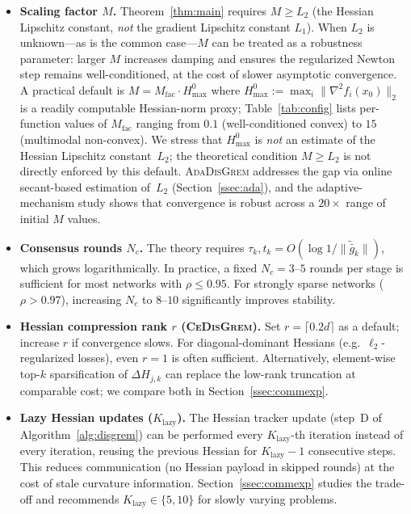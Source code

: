 \documentclass[11pt,a4paper]{article}
\def\cO{O}%
\newcommand{\cO}{\mathcal{O}}
\begin{document}
	\begin{itemize}[leftmargin=1.2em,itemsep=2pt]
		\item \textbf{Scaling factor $M$.}
		Theorem~\ref{thm:main} requires $M\ge L_2$
		(the Hessian Lipschitz constant, \emph{not} the gradient Lipschitz
		constant $L_1$).
		When $L_2$ is unknown---as is the common case---$M$ can be treated
		as a robustness parameter: larger $M$ increases damping and ensures the
		regularized Newton step remains well-conditioned, at the cost of
		slower asymptotic convergence.
		A practical default is $M = M_{\mathrm{fac}} \cdot H_{\max}^{0}$ where
		$H_{\max}^{0} := \max_i\|\nabla^2 f_i(x_0)\|_2$ is a readily
		computable Hessian-norm proxy;
		Table~\ref{tab:config} lists per-function values of $M_{\mathrm{fac}}$
		ranging from $0.1$ (well-conditioned convex) to $15$ (multimodal non-convex).
		We stress that $H_{\max}^{0}$ is \emph{not} an estimate of the Hessian
		Lipschitz constant~$L_2$; the theoretical condition $M\ge L_2$
		is not directly enforced by this default.
		\textsc{AdaDisGrem} addresses the gap via online secant-based
		estimation of~$L_2$ (Section~\ref{ssec:ada}), and the
		adaptive-mechanism study shows that convergence is robust
		across a $20\times$ range of initial $M$ values.
		\item \textbf{Consensus rounds $N_c$.}
		The theory requires $\tau_k, t_k = \cO(\log 1/\|\tilde{\bar g}_k\|)$, which grows
		logarithmically.  In practice, a fixed $N_c = 3$--$5$ rounds per stage is sufficient
		for most networks with $\rho \le 0.95$.
		For strongly sparse networks ($\rho > 0.97$), increasing $N_c$ to $8$--$10$
		significantly improves stability.
		\item \textbf{Hessian compression rank $r$ (\textsc{CeDisGrem}).}
		Set $r = \lceil 0.2d \rceil$ as a default; increase $r$ if convergence slows.
		For diagonal-dominant Hessians (e.g.\ $\ell_2$-regularized losses), even $r=1$
		is often sufficient.
		Alternatively, element-wise top-$k$ sparsification of $\Delta H_{j,k}$
		can replace the low-rank truncation at comparable cost; we compare both in
		Section~\ref{ssec:commexp}.
		\item \textbf{Lazy Hessian updates ($K_{\mathrm{lazy}}$).}
		The Hessian tracker update (step~D of Algorithm~\ref{alg:disgrem}) can be
		performed every $K_{\mathrm{lazy}}$-th iteration instead of every iteration,
		reusing the previous Hessian for $K_{\mathrm{lazy}}{-}1$ consecutive steps.
		This reduces communication (no Hessian payload in skipped rounds) at the cost
		of stale curvature information.
		Section~\ref{ssec:commexp} studies the trade-off and recommends
		$K_{\mathrm{lazy}}\in\{5,10\}$ for slowly varying problems.
	\end{itemize}
	
\end{document}
